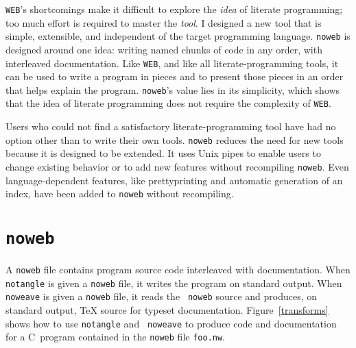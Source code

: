 {\tt WEB}'s shortcomings make it difficult to explore the {\em idea}
of literate programming; too much effort is required to master the
{\em tool}.
I designed a new tool that is 
simple, extensible, and independent of the target programming language.
{\tt noweb} is designed 
around one idea: writing named chunks of code in any order, with
interleaved documentation. 
Like {\tt WEB}, and like all literate-programming tools, it can
be used to write a program in pieces and to present those pieces in
an order that helps explain the program.
{\tt noweb}'s value lies in its simplicity, which shows that the idea
of literate programming does not require the complexity of {\tt WEB}.

Users who could not find a satisfactory literate-programming tool
have had no option other than to write their own tools.
{\tt noweb} reduces the need for new tools because it is designed to
be extended.
It uses Unix pipes to enable users to change existing
behavior or to add new features {without} recompiling {\tt noweb}.
Even language-dependent features, like
prettyprinting and automatic generation of an index, have been added
to {\tt noweb} without recompiling.



\section{{\tt noweb}} %
A {\tt noweb} file contains program source code interleaved with documentation.
When {\tt notangle} is given a {\tt noweb} file, it writes the program
 on standard output. 
When {\tt noweave} is given a {\tt noweb} file, it reads the {\tt
noweb} source and produces, on standard output, {\TeX} source for
typeset documentation.
Figure~\ref{transforms} shows how to use {\tt notangle} and {\tt
noweave} to produce code and documentation for a C~program contained
in the {\tt noweb} file {\tt foo.nw}.

